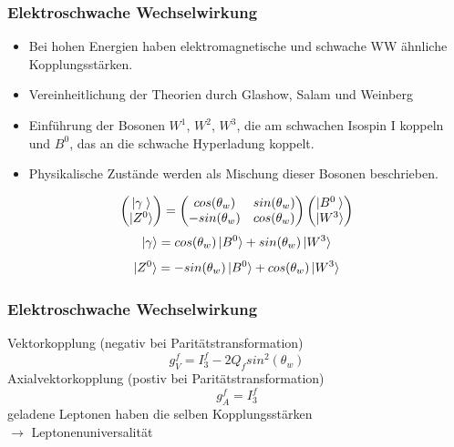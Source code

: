 \begin{frame}
	\frametitle{Elektroschwache Wechselwirkung}
	\begin{center}
		\begin{itemize}
			\item
			Bei hohen Energien haben elektromagnetische und schwache WW ähnliche Kopplungsstärken.
			\item
			Vereinheitlichung der Theorien durch Glashow, Salam und Weinberg
			\item
			Einführung der Bosonen $W^1$, $W^2$, $W^3$, die am schwachen Isospin I koppeln und $B^0$, das an die schwache Hyperladung koppelt.
			\item
			Physikalische Zustände werden als Mischung dieser Bosonen beschrieben.
		\end{itemize}
		\begin{equation*}
		\begin{pmatrix}
		\ket{\gamma\;}\\
		\ket{Z^0}
		\end{pmatrix} = 
		\begin{pmatrix}
		cos(\theta_w) & sin(\theta_w)\\
		-sin(\theta_w) & cos(\theta_w)\\
		\end{pmatrix}
		\begin{pmatrix}
		\ket{B^0\:}\\
		\ket{W^3}
		\end{pmatrix}
		\end{equation*}
		\begin{equation*}
			\ket{\gamma} =  cos(\theta_w)\ket{B^0} + sin(\theta_w) \ket{W^3}
		\end{equation*}
		\begin{equation*}
		\ket{Z^0} = -sin(\theta_w) \ket{B^0} + cos(\theta_w) \ket{W^3}
		\end{equation*}
	\end{center}
\end{frame}

\begin{frame}
	\begin{center}
	\frametitle{Elektroschwache Wechselwirkung}
	Vektorkopplung (negativ bei Paritätstransformation)
	\begin{equation*}
	g_V^f = I^f_3-2 Q_f sin^2(\theta_w)
	\end{equation*}
	Axialvektorkopplung (postiv bei Paritätstransformation)
	\begin{equation*}
	g_A^f = I^f_3
	\end{equation*}
	geladene Leptonen haben die selben Kopplungsstärken\\
	$\rightarrow$ Leptonenuniversalität
	\end{center}
\end{frame}
